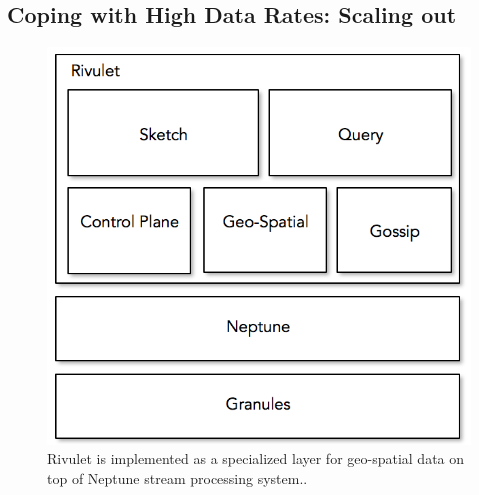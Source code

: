 \subsection{Coping with High Data Rates: Scaling out}
\begin{figure}
    \centerline{\includegraphics[scale=0.5]{figures/rivulet-archi.png}}
    \caption{Rivulet is implemented as a specialized layer for geo-spatial data on top of Neptune stream processing system..}
    \label{fig:process-monitor}
\end{figure}
%
